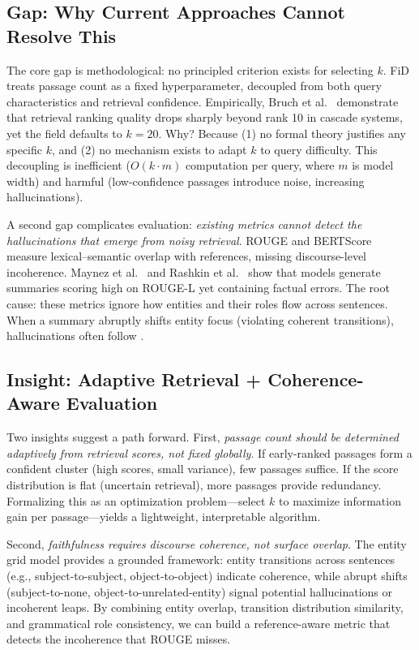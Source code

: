 \documentclass[11pt,a4paper]{article}
\begin{document}
\subsection*{Gap: Why Current Approaches Cannot Resolve This}

The core gap is methodological: no principled criterion exists for selecting $k$. FiD treats passage count as a fixed hyperparameter, decoupled from both query characteristics and retrieval confidence. Empirically, Bruch et al.\ \cite{bruch2021efficient} demonstrate that retrieval ranking quality drops sharply beyond rank 10 in cascade systems, yet the field defaults to $k=20$. Why? Because (1) no formal theory justifies any specific $k$, and (2) no mechanism exists to adapt $k$ to query difficulty. This decoupling is inefficient ($O(k \cdot m)$ computation per query, where $m$ is model width) and harmful (low-confidence passages introduce noise, increasing hallucinations).

A second gap complicates evaluation: \emph{existing metrics cannot detect the hallucinations that emerge from noisy retrieval}. ROUGE and BERTScore measure lexical--semantic overlap with references, missing discourse-level incoherence. Maynez et al.\ \cite{maynez2021faithfulness} and Rashkin et al.\ \cite{rashkin2021evaluating} show that models generate summaries scoring high on ROUGE-L yet containing factual errors. The root cause: these metrics ignore how entities and their roles flow across sentences. When a summary abruptly shifts entity focus (violating coherent transitions), hallucinations often follow \cite{barzilay2008modeling}.

\subsection*{Insight: Adaptive Retrieval + Coherence-Aware Evaluation}

Two insights suggest a path forward. First, \emph{passage count should be determined adaptively from retrieval scores, not fixed globally}. If early-ranked passages form a confident cluster (high scores, small variance), few passages suffice. If the score distribution is flat (uncertain retrieval), more passages provide redundancy. Formalizing this as an optimization problem---select $k$ to maximize information gain per passage---yields a lightweight, interpretable algorithm.

Second, \emph{faithfulness requires discourse coherence, not surface overlap}. The entity grid model \cite{barzilay2008modeling} provides a grounded framework: entity transitions across sentences (e.g., subject-to-subject, object-to-object) indicate coherence, while abrupt shifts (subject-to-none, object-to-unrelated-entity) signal potential hallucinations or incoherent leaps. By combining entity overlap, transition distribution similarity, and grammatical role consistency, we can build a reference-aware metric that detects the incoherence that ROUGE misses.
\end{document}
